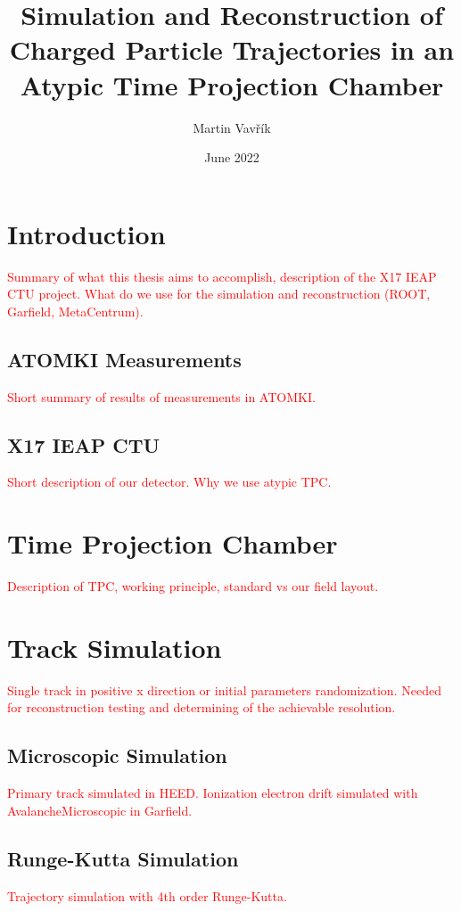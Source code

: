\documentclass[]{article}
\title{Simulation and Reconstruction of Charged Particle Trajectories in an Atypic Time Projection Chamber}
\author{Martin Vavřík}
\date{June 2022}
\begin{document}
	
	\maketitle
	
	\section{Introduction}
		\textcolor{red}{Summary of what this thesis aims to accomplish, description of the X17 IEAP CTU project. What do we use for the simulation and reconstruction (ROOT, Garfield, MetaCentrum).}
		
		\subsection{ATOMKI Measurements}
			\textcolor{red}{Short summary of results of measurements in ATOMKI.}
			
		\subsection{X17 IEAP CTU}
			\textcolor{red}{Short description of our detector. Why we use atypic TPC.}
	
	\section{Time Projection Chamber}
		\textcolor{red}{Description of TPC, working principle, standard vs our field layout.}
		
	\section{Track Simulation}
		\textcolor{red}{Single track in positive x direction or initial parameters randomization. Needed for reconstruction testing and determining of the achievable resolution.}
	
		\subsection{Microscopic Simulation}
			\textcolor{red}{Primary track simulated in HEED. Ionization electron drift simulated with AvalancheMicroscopic in Garfield.}
			
		\subsection{Runge-Kutta Simulation}
			\textcolor{red}{Trajectory simulation with 4th order Runge-Kutta.}
			
\end{document}
